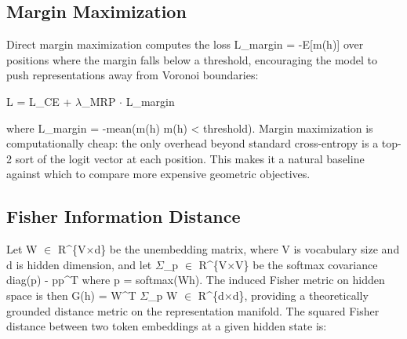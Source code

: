\documentclass[
  11pt,
]{article}
\begin{document}
\hypertarget{margin-maximization}{%
\subsection{Margin Maximization}\label{margin-maximization}}

Direct margin maximization computes the loss L\_margin = -E{[}m(h){]}
over positions where the margin falls below a threshold, encouraging the
model to push representations away from Voronoi boundaries:

L = L\_CE + $\lambda$\_MRP $\cdot$ L\_margin

where L\_margin = -mean(m(h) \textbar{} m(h) \textless{} threshold).
Margin maximization is computationally cheap: the only overhead beyond
standard cross-entropy is a top-2 sort of the logit vector at each
position. This makes it a natural baseline against which to compare more
expensive geometric objectives.

\begin{figure}[H]
\centering
{}
\end{figure}

\hypertarget{fisher-information-distance}{%
\subsection{Fisher Information
Distance}\label{fisher-information-distance}}

Let W $\in$ R\^{}\{V$\times$d\} be the unembedding matrix, where V is vocabulary
size and d is hidden dimension, and let $\Sigma$\_p $\in$ R\^{}\{V$\times$V\} be the
softmax covariance diag(p) - pp\^{}T where p = softmax(Wh). The induced
Fisher metric on hidden space is then G(h) = W\^{}T $\Sigma$\_p W $\in$
R\^{}\{d$\times$d\}, providing a theoretically grounded distance metric on the
representation manifold. The squared Fisher distance between two token
embeddings at a given hidden state is:
\end{document}

